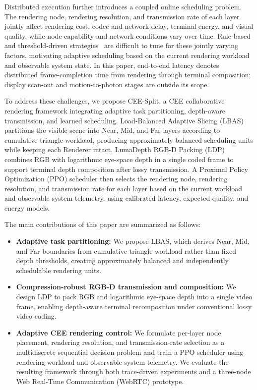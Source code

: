 \documentclass[acmsmall]{acmart}
\begin{document}
	Distributed execution further introduces a coupled online scheduling problem. The rendering node, rendering resolution, and transmission rate of each layer jointly affect rendering cost, codec and network delay, terminal energy, and visual quality, while node capability and network conditions vary over time. Rule-based and threshold-driven strategies~\cite{lai_furion_2020,lu_renderfusion_2023} are difficult to tune for these jointly varying factors, motivating adaptive scheduling based on the current rendering workload and observable system state. In this paper, end-to-end latency denotes distributed frame-completion time from rendering through terminal composition; display scan-out and motion-to-photon stages are outside its scope.
	
	To address these challenges, we propose CEE-Split, a CEE collaborative rendering framework integrating adaptive task partitioning, depth-aware transmission, and learned scheduling. Load-Balanced Adaptive Slicing (LBAS) partitions the visible scene into Near, Mid, and Far layers according to cumulative triangle workload, producing approximately balanced scheduling units while keeping each Renderer intact. LumaDepth RGB-D Packing (LDP) combines RGB with logarithmic eye-space depth in a single coded frame to support terminal depth composition after lossy transmission. A Proximal Policy Optimization (PPO) scheduler then selects the rendering node, rendering resolution, and transmission rate for each layer based on the current workload and observable system telemetry, using calibrated latency, expected-quality, and energy models.
	
	The main contributions of this paper are summarized as follows:
	
	\begin{itemize}
		\item \textbf{Adaptive task partitioning:}
		We propose LBAS, which derives Near, Mid, and Far boundaries from cumulative triangle workload rather than fixed depth thresholds, creating approximately balanced and independently schedulable rendering units.
		
		\item \textbf{Compression-robust RGB-D transmission and composition:}
		We design LDP to pack RGB and logarithmic eye-space depth into a single video frame, enabling depth-aware terminal recomposition under conventional lossy video coding.
		
		\item \textbf{Adaptive CEE rendering control:}
		We formulate per-layer node placement, rendering resolution, and transmission-rate selection as a multidiscrete sequential decision problem and train a PPO scheduler using rendering workload and observable system telemetry. We evaluate the resulting framework through both trace-driven experiments and a three-node Web Real-Time Communication (WebRTC) prototype.
		
	\end{itemize}
	
\end{document}
